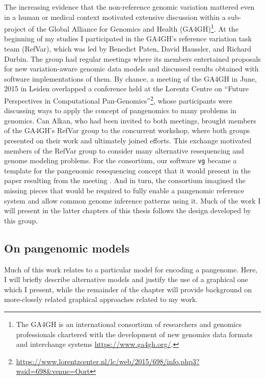 The increasing evidence that the non-reference genomic variation mattered even in a human or medical context motivated extensive discussion within a sub-project of the Global Alliance for Genomics and Health (GA4GH)\footnote{The GA4GH is an international consortium of researchers and genomics professionals chartered with the development of new genomics data formats and interchange systems \url{https://www.ga4gh.org/}.}.
At the beginning of my studies I participated in the GA4GH's reference variation task team (RefVar), which was led by Benedict Paten, David Haussler, and Richard Durbin.
The group had regular meetings where its members entertained proposals for new variation-aware genomic data models and discussed results obtained with software implementations of them.
By chance, a meeting of the GA4GH in June, 2015 in Leiden overlapped a conference held at the Lorentz Centre on ``Future Perspectives in Computational Pan-Genomics''\footnote{\url{https://www.lorentzcenter.nl/lc/web/2015/698/info.php3?wsid=698\&venue=Oort}}, whose participants were discussing ways to apply the concept of pangenomics to many problems in genomics.
Can Alkan, who had been invited to both meetings, brought members of the GA4GH's RefVar group to the concurrent workshop, where both groups presented on their work and ultimately joined efforts.
This exchange motivated members of the RefVar group to consider many alternative resequencing and genome modeling problems.
For the consortium, our software {\tt vg} became a template for the pangenomic resequencing concept that it would present in the paper resulting from the meeting \cite{computational2016computational}.
And in turn, the consortium imagined the missing pieces that would be required to fully enable a pangenomic reference system and allow common genome inference patterns using it.
Much of the work I will present in the latter chapters of this thesis follows the design developed by this group.


\subsection{On pangenomic models}

Much of this work relates to a particular model for encoding a pangenome. Here, I will briefly describe alternative models and justify the use of a graphical one which I present, while the remainder of the chapter will provide background on more-closely related graphical approaches related to my work.

